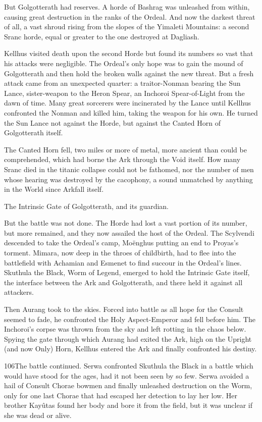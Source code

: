 \documentclass[]{book}
\begin{document}
But Golgotterath had reserves. A horde of Bashrag was unleashed from within, causing
great destruction in the ranks of the Ordeal. And now the darkest threat of all, a vast
shroud rising from the slopes of the Yimaleti Mountains: a second Sranc horde, equal
or greater to the one destroyed at Dagliash.

Kellhus visited death upon the second Horde but found its numbers so vast that his
attacks were negligible. The Ordeal's only hope was to gain the mound of Golgotterath
and then hold the broken walls against the new threat. But a fresh attack came from an
unexpected quarter: a traitor-Nonman bearing the Sun Lance, sister-weapon to the
Heron Spear, an Inchoroi Spear-of-Light from the dawn of time. Many great sorcerers
were incinerated by the Lance until Kellhus confronted the Nonman and killed him,
taking the weapon for his own. He turned the Sun Lance not against the Horde, but
against the Canted Horn of Golgotterath itself.

The Canted Horn fell, two miles or more of metal, more ancient than could be
comprehended, which had borne the Ark through the Void itself. How many Sranc
died in the titanic collapse could not be fathomed, nor the number of men whose
hearing was destroyed by the cacophony, a sound unmatched by anything in the World
since Arkfall itself.

The Intrinsic Gate of Golgotterath, and its guardian.

But the battle was not done. The Horde had lost a vast portion of its number, but more
remained, and they now assailed the host of the Ordeal. The Scylvendi descended to
take the Ordeal's camp, Moënghus putting an end to Proyas's torment. Mimara, now
deep in the throes of childbirth, had to flee into the battlefield with Achamian and
Esmenet to find succour in the Ordeal's lines. Skuthula the Black, Worm of Legend,
emerged to hold the Intrinsic Gate itself, the interface between the Ark and
Golgotterath, and there held it against all attackers.

Then Aurang took to the skies. Forced into battle as all hope for the Consult seemed to
fade, he confronted the Holy Aspect-Emperor and fell before him. The Inchoroi's
corpse was thrown from the sky and left rotting in the chaos below. Spying the gate
through which Aurang had exited the Ark, high on the Upright (and now Only) Horn,
Kellhus entered the Ark and finally confronted his destiny.

106The battle continued. Serwa confronted Skuthula the Black in a battle which would
have stood for the ages, had it not been seen by so few. Serwa avoided a hail of Consult
Chorae bowmen and finally unleashed destruction on the Worm, only for one last
Chorae that had escaped her detection to lay her low. Her brother Kayûtas found her
body and bore it from the field, but it was unclear if she was dead or alive.
\end{document}
